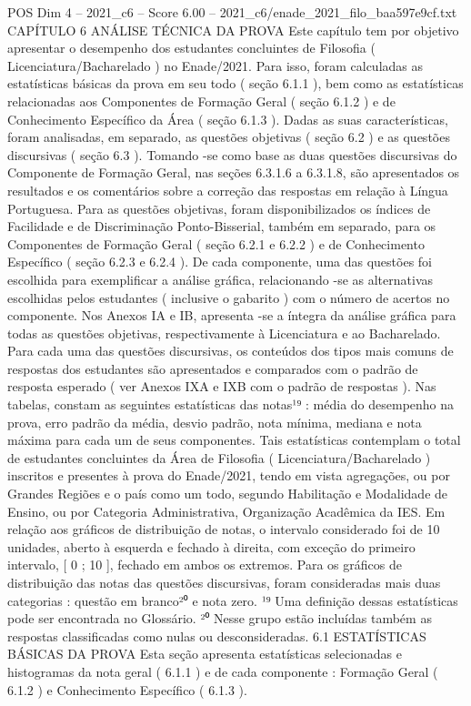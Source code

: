 \begin{textsample}{POS Dim 4 – 2021\_c6 – Score 6.00 – 2021\_c6/enade\_2021\_filo\_baa597e9cf.txt}  \label{ex:f4_pos_066}
CAPÍTULO 6 ANÁLISE TÉCNICA DA PROVA Este capítulo tem por objetivo apresentar o desempenho dos estudantes concluintes de Filosofia ( Licenciatura/Bacharelado ) no Enade/2021.
Para isso, foram calculadas as estatísticas básicas da prova em seu todo ( seção 6.1.1 ), bem como as estatísticas relacionadas aos Componentes de Formação Geral ( seção 6.1.2 ) e de Conhecimento Específico da Área ( seção 6.1.3 ).
Dadas as suas características, foram analisadas, em separado, as questões objetivas ( seção 6.2 ) e as questões discursivas ( seção 6.3 ).
Tomando -se como base as duas questões discursivas do Componente de Formação Geral, nas seções 6.3.1.6 a 6.3.1.8, são apresentados os resultados e os comentários sobre a correção das respostas em relação à Língua Portuguesa.
Para as questões objetivas, foram disponibilizados os índices de Facilidade e de Discriminação Ponto-Bisserial, também em separado, para os Componentes de Formação Geral ( seção 6.2.1 e 6.2.2 ) e de Conhecimento Específico ( seção 6.2.3 e 6.2.4 ).
De cada componente, uma das questões foi escolhida para exemplificar a análise gráfica, relacionando -se as alternativas escolhidas pelos estudantes ( inclusive o gabarito ) com o número de acertos no componente.
Nos Anexos IA e IB, apresenta -se a íntegra da análise gráfica para todas as questões objetivas, respectivamente à Licenciatura e ao Bacharelado.
Para cada uma das questões discursivas, os conteúdos dos tipos mais comuns de respostas dos estudantes são apresentados e comparados com o padrão de resposta esperado ( ver Anexos IXA e IXB com o padrão de respostas ).
Nas tabelas, constam as seguintes estatísticas das notas¹⁹ : média do desempenho na prova, erro padrão da média, desvio padrão, nota mínima, mediana e nota máxima para cada um de seus componentes.
Tais estatísticas contemplam o total de estudantes concluintes da Área de Filosofia ( Licenciatura/Bacharelado ) inscritos e presentes à prova do Enade/2021, tendo em vista agregações, ou por Grandes Regiões e o país como um todo, segundo Habilitação e Modalidade de Ensino, ou por Categoria Administrativa, Organização Acadêmica da IES.
Em relação aos gráficos de distribuição de notas, o intervalo considerado foi de 10 unidades, aberto à esquerda e fechado à direita, com exceção do primeiro intervalo, [ 0 ; 10 ], fechado em ambos os extremos.
Para os gráficos de distribuição das notas das questões discursivas, foram consideradas mais duas categorias : questão em branco²⁰ e nota zero. ¹⁹ Uma definição dessas estatísticas pode ser encontrada no Glossário. ²⁰ Nesse grupo estão incluídas também as respostas classificadas como nulas ou desconsideradas. 6.1 ESTATÍSTICAS BÁSICAS DA PROVA Esta seção apresenta estatísticas selecionadas e histogramas da nota geral ( 6.1.1 ) e de cada componente : Formação Geral ( 6.1.2 ) e Conhecimento Específico ( 6.1.3 ).

\end{textsample}
